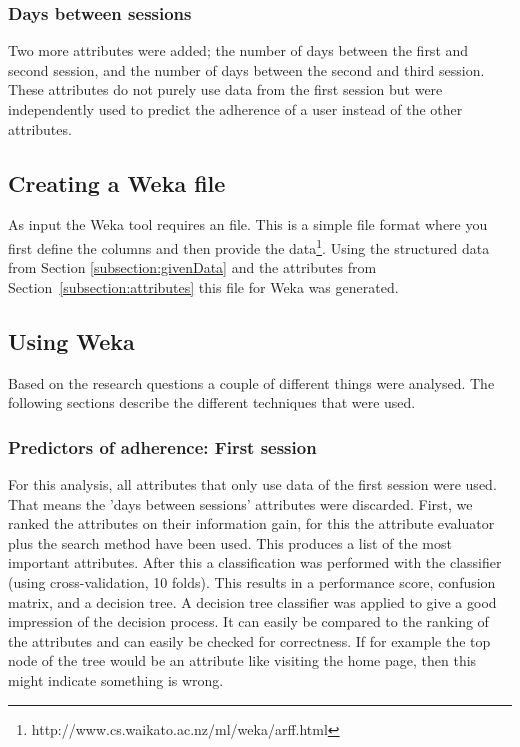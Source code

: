 \subsubsection{Days between sessions}
Two more attributes were added; the number of days between the first and second session, and the number of days between the second and third session. These attributes do not purely use data from the first session but were independently used to predict the adherence of a user instead of the other attributes.

\subsection{Creating a Weka file}
As input the Weka tool requires an  file. This is a simple file format where you first define the columns and then provide the data\footnote{http://www.cs.waikato.ac.nz/ml/weka/arff.html}. Using the structured data from Section \ref{subsection:givenData} and the attributes from Section~\ref{subsection:attributes} this file for Weka was generated.

\subsection{Using Weka} \label{subsection:usingWeka}
Based on the research questions a couple of different things were analysed. The following sections describe the different techniques that were used.

\subsubsection{Predictors of adherence: First session}
For this analysis, all attributes that only use data of the first session were used. That means the 'days between sessions' attributes were discarded. First, we ranked the attributes on their information gain, for this the  attribute evaluator plus the  search met\allowbreak hod have been used. This produces a list of the most important attributes. After this a classification was performed with the  classifier (using cross-validation, 10 folds). This results in a performance score, confusion matrix, and a decision tree. A decision tree classifier was applied to give a good impression of the decision process. It can easily be compared to the ranking of the attributes and can easily be checked for correctness. If for example the top node of the tree would be an attribute like visiting the home page, then this might indicate something is wrong.

